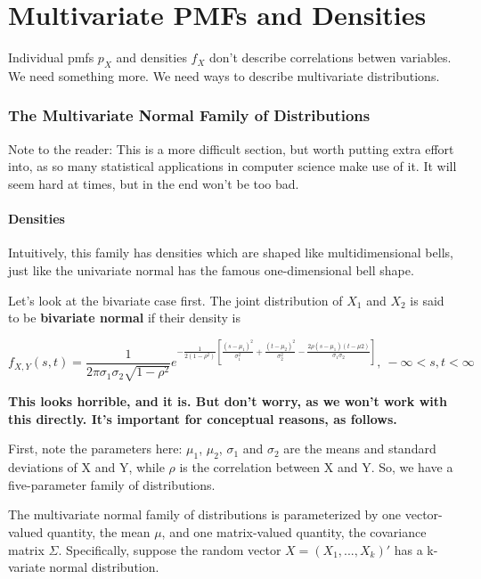 \chapter{Multivariate PMFs and Densities}
\label{mul}

Individual pmfs $p_X$ and densities $f_X$ don't describe correlations
betwen variables.  We need something more.  We need ways to describe
multivariate distributions.


\subsection{The Multivariate Normal Family of Distributions }
\label{multnormal}

Note to the reader:  This is a more difficult section, but worth putting
extra effort into, as so many statistical applications in computer
science make use of it.  It will seem hard at times, but in the end
won't be too bad.

\subsubsection{Densities}
\label{mvnormdens}

Intuitively, this family has densities which are shaped like
multidimensional bells, just like the univariate normal has the famous
one-dimensional bell shape.  

Let's look at the bivariate case first.  The joint distribution of
$X_1$ and $X_2$ is said to be {\bf bivariate normal} if their density is

\begin{equation}
f_{X,Y}(s,t) = \frac{1}{2\pi \sigma_1 \sigma_2 \sqrt{1-\rho^2}}
e^
{-\frac{1}{2(1-\rho^2)} 
\left [
\frac{(s-\mu_1)^2}{\sigma_1^2} + \frac{(t-\mu_2)^2}{\sigma_2^2} 
-\frac
{2\rho (s-\mu_1)(t-\mu2)}
{\sigma_1 \sigma_2}
\right ]
}, ~ -\infty < s,t < \infty
\end{equation}

{\bf This looks horrible, and it is.  But don't worry, as we won't work
with this directly.  It's important for conceptual reasons, as follows.}

First, note the parameters here:  $\mu_1$, $\mu_2$, $\sigma_1$ and
$\sigma_2$ are the means and standard deviations of X and Y,
while $\rho$ is the correlation between X and Y.  So, we have a
five-parameter family of distributions.

The multivariate normal family of distributions is parameterized by one
vector-valued quantity, the mean $\mu$, and one matrix-valued quantity,
the covariance matrix $\Sigma$.  Specifically, suppose the random vector
$X = (X_1,...,X_k)'$ has a k-variate normal distribution.

